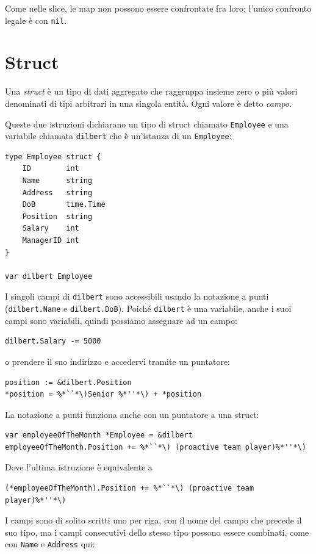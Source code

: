 Come nelle slice, le map non possono essere confrontate fra loro;
l'unico confronto legale è con \verb|nil|.


\section{Struct}
\label{sec:struct}%
Una \textit{struct} è un tipo di dati aggregato che raggruppa insieme zero o più valori denominati di tipi arbitrari in una singola entità.
Ogni valore è detto \textit{campo}.

Queste due istruzioni dichiarano un tipo di struct chiamato \verb|Employee| e una variabile chiamata \verb|dilbert| che è un'istanza di un \verb|Employee|:
\begin{lstlisting}[frame=single, label={lst:lstlisting3-4.1}]
type Employee struct {
    ID 	      int
    Name      string
    Address   string
    DoB       time.Time
    Position  string
    Salary    int
    ManagerID int
}

var dilbert Employee
\end{lstlisting}
I singoli campi di \verb|dilbert| sono accessibili usando la notazione a punti (\verb|dilbert.Name| e \verb|dilbert.DoB|).
Poiché \verb|dilbert| è una variabile, anche i suoi campi sono variabili, quindi possiamo assegnare ad un campo:
\begin{lstlisting}[frame=single, label={lst:lstlisting3-4.2}]
dilbert.Salary -= 5000
\end{lstlisting}
o prendere il suo indirizzo e accedervi tramite un puntatore:
\begin{lstlisting}[frame=single, label={lst:lstlisting3-4.3}]
position := &dilbert.Position
*position = %*``*\)Senior %*''*\) + *position
\end{lstlisting}
La notazione a punti funziona anche con un puntatore a una struct:
\begin{lstlisting}[frame=single, label={lst:lstlisting3-4.4}]
var employeeOfTheMonth *Employee = &dilbert
employeeOfTheMonth.Position += %*``*\) (proactive team player)%*''*\)
\end{lstlisting}
Dove l'ultima istruzione è equivalente a
\begin{lstlisting}[frame=single, label={lst:lstlisting3-4.5}]
(*employeeOfTheMonth).Position += %*``*\) (proactive team player)%*''*\)
\end{lstlisting}
I campi sono di solito scritti uno per riga, con il nome del campo che precede il suo tipo, ma i campi consecutivi dello stesso tipo possono essere combinati, come con \verb|Name| e \verb|Address| qui:
